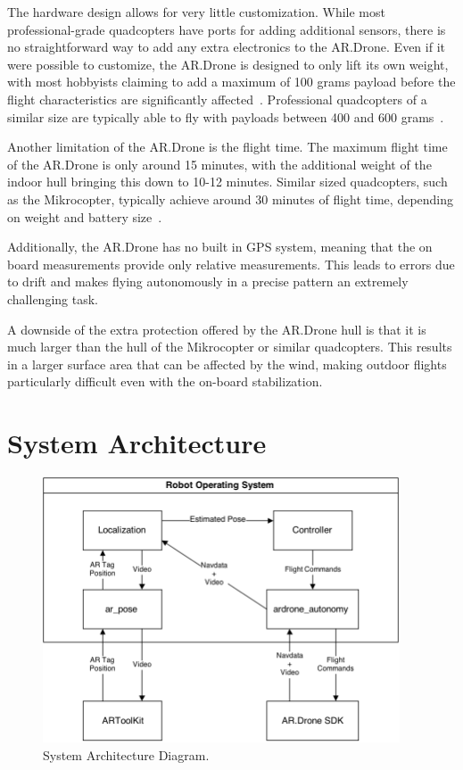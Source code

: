         The hardware design allows for very little customization. While most professional-grade quadcopters have ports for adding additional sensors, there is no straightforward way to add any extra electronics to the AR.Drone. Even if it were possible to customize, the AR.Drone is designed to only lift its own weight, with most hobbyists claiming to add a maximum of 100 grams payload before the flight characteristics are significantly affected~\cite{Forums}. Professional quadcopters of a similar size are typically able to fly with payloads between 400 and 600 grams~\cite{Mikrocopter}.

        Another limitation of the AR.Drone is the flight time. The maximum flight time of the AR.Drone is only around 15 minutes, with the additional weight of the indoor hull bringing this down to 10-12 minutes. Similar sized quadcopters, such as the Mikrocopter, typically achieve around 30 minutes of flight time, depending on weight and battery size~\cite{Mikrocopter}.

        Additionally, the AR.Drone has no built in GPS system, meaning that the on board measurements provide only relative measurements. This leads to errors due to drift and makes flying autonomously in a precise pattern an extremely challenging task.

        A downside of the extra protection offered by the AR.Drone hull is that it is much larger than the hull of the Mikrocopter or similar quadcopters. This results in a larger surface area that can be affected by the wind, making outdoor flights particularly difficult even with the on-board stabilization. 

\section{System Architecture}

    \begin{figure}[ht]
            \centering
            \includegraphics[width=400px]{../images/system.png}
            \caption{System Architecture Diagram.}\label{fig:system}
    \end{figure}

